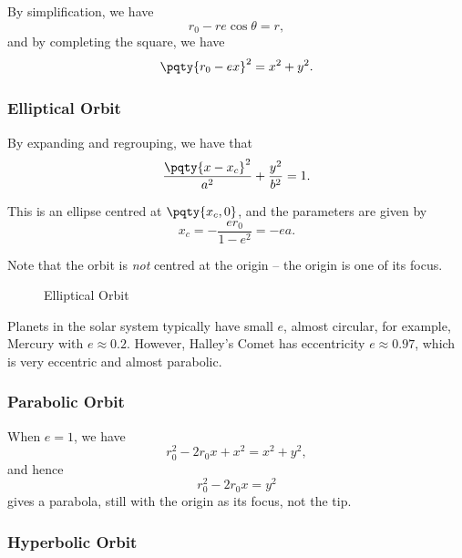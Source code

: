 By simplification, we have
\begin{equation}
    r_0 - r e \cos \theta = r,
\end{equation}
and by completing the square, we have
\begin{equation}
    \pqty{r_0 - ex}^2 = x^2 + y^2.
\end{equation}

\subsubsection{Elliptical Orbit}

By expanding and regrouping, we have that
\begin{equation}
    \frac{\pqty{x - x_c}^2}{a^2} + \frac{y^2}{b^2} = 1.
\end{equation}

This is an ellipse centred at \(\pqty{x_c, 0}\), and the parameters are given by
\begin{equation}
    x_c = - \frac{e r_0}{1 - e^2} = -ea.
\end{equation}

Note that the orbit is \emph{not} centred at the origin -- the origin is one of its focus.

\begin{figure}[ht!]
    \centering

    \caption{Elliptical Orbit}
    \label{fig:elliptical-orbit}%
\end{figure}

Planets in the solar system typically have small \(e\), almost circular, for example, Mercury with \(e \approx 0.2\). However, Halley's Comet has eccentricity \(e \approx 0.97\), which is very eccentric and almost parabolic.

\subsubsection{Parabolic Orbit}

When \(e = 1\), we have
\begin{equation}
    r_0^2 - 2 r_0 x + x^2 = x^2 + y^2,
\end{equation}
and hence
\begin{equation}
    r_0^2 - 2 r_0 x = y^2
\end{equation}
gives a parabola, still with the origin as its focus, not the tip.

\subsubsection{Hyperbolic Orbit}

